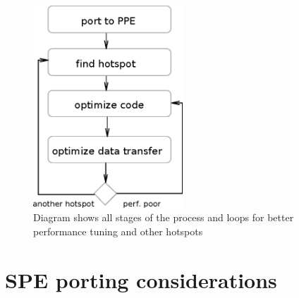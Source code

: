 \begin{figure}
    \centering
    \includegraphics[width=0.5\textwidth]{data/portingCycle}
    \caption[Application for Cell B.E. porting process]{Diagram shows all stages of the process and loops for better performance tuning and other hotspots}
    \label{fg:appPorting}
\end{figure}

\section {SPE porting considerations}

